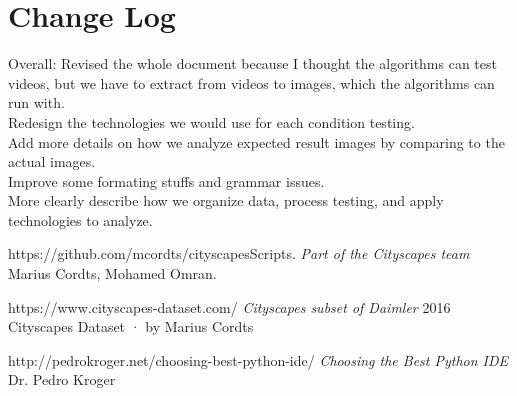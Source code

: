\documentclass[10pt,draftclsnofoot,onecolumn,journal,compsoc]{IEEEtran}
\begin{document}

\section{Change Log}
Overall: Revised the whole document because I thought the algorithms can test videos, but we have to extract from videos to images, which the algorithms can run with.\\
Redesign the technologies we would use for each condition testing.\\
Add more details on how we analyze expected result images by comparing to the actual images.\\
Improve some formating stuffs and grammar issues.\\
More clearly describe how we organize data, process testing, and apply technologies to analyze. 
 



\newpage



\begin{thebibliography}{12}

 https://github.com/mcordts/cityscapesScripts.
\textit{Part of the Cityscapes team} Marius Cordts, Mohamed Omran.

 https://www.cityscapes-dataset.com/
\textit{Cityscapes subset of Daimler} 2016 Cityscapes Dataset · by Marius Cordts 

 http://pedrokroger.net/choosing-best-python-ide/
\textit{Choosing the Best Python IDE} Dr. Pedro Kroger

\end{thebibliography}
        
\end{document}

